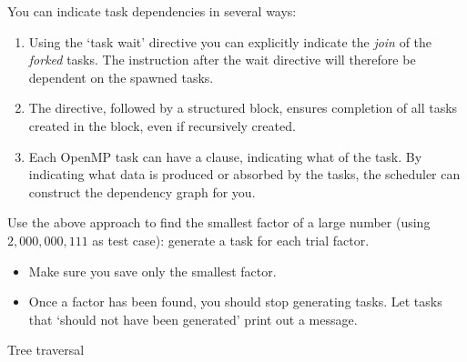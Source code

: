 You can indicate task dependencies in several ways:
\begin{enumerate}
\item Using the `task wait' directive you can explicitly indicate
  the \emph{join} of the
  \emph{forked} tasks. The instruction after the wait directive
  will therefore be dependent on the spawned tasks.
\item The  directive, followed
  by a structured block, ensures completion of all tasks
  created in the block, even if recursively created.
\item Each OpenMP task can have a 
  clause, indicating what  of the task.
  By indicating what data is produced or absorbed by the tasks,
  the scheduler can construct the dependency graph for you.
\end{enumerate}

\begin{exercise}
  Use the above approach to find the smallest factor of a large
  number (using $2,000,000,111$ as test case): generate a task for each
  trial factor.
  \begin{itemize}
  \item Make sure you save only the smallest factor.
  \item Once a factor has been found, you should stop generating
    tasks.
    Let tasks that `should not have been generated' print out a message.
  \end{itemize}
\end{exercise}


 {Tree traversal}

\begin{comment}
Pre-order traversal while duplicating nodes and edges can make a
complete duplicate of a binary tree. It can also be used to make a
prefix expression (Polish notation) from expression trees: traverse
the expression tree pre-orderly.

In-order traversal is very commonly used on binary search trees
because it returns values from the underlying set in order, according
to the comparator that set up the binary search tree (hence the name).

Post-order traversal while deleting or freeing nodes and values can
delete or free an entire binary tree. It can also generate a postfix
representation of a binary tree.

If you know you need to explore the roots before inspecting any
leaves, you pick pre-order because you will encounter all the roots
before all of the leaves.

If you know you need to explore all the leaves before any nodes, you
select post-order because you don't waste any time inspecting roots in
search for leaves.

If you know that the tree has an inherent sequence in the nodes, and
you want to flatten the tree back into its original sequence, than an
in-order traversal should be used. The tree would be flattened in the
same way it was created. A pre-order or post-order traversal might not
unwind the tree back into the sequence which was used to create it.
\end{comment}

